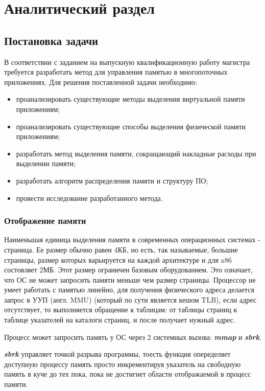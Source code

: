 \chapter{Аналитический раздел}
\label{cha:analysis}
\section{Постановка задачи}
В соответствии с заданием на выпускную квалификационную работу магистра требуется разработать метод для управления памятью в многопоточных приложениях.
Для решения поставленной задачи необходимо:
\begin{itemize}
	\item проанализировать существующие методы выделения виртуальной памяти приложениям;
	\item проанализировать существующие способы выделения физической памяти приложениям;
	\item разработать метод выделения памяти, сокращающий накладные расходы при выделении памяти;
	\item разработать алгоритм распределения памяти и структуру ПО;
	\item провести исследование разработанного метода.
\end{itemize}

\subsection{Отображение памяти}
Наименьшая единица выделения памяти в современных операционных системах - страница\cite{page}. Ее размер обычно равен 4КБ, но есть, так называемые, большие страницы, размер которых варьируется на каждой архитектуре и для x86 состовляет 2МБ. Этот размер ограничен базовым оборудованием. Это означает, что ОС не может запросить памяти меньше чем размер страницы. Процессор не умеет работать с памятью линейно, для получения физического адреса делается запрос в УУП (англ. MMU)\cite{mmu}  (который   по   сути является кешом TLB)\cite{tlb}, если адрес отсутствует, то выполняется обращение к таблицам: от таблицы страниц к таблице указателей на каталоги страниц, и после получает нужный адрес.\cite{wepskam}

Процесс может запросить память у ОС через 2 системных вызова: \textbf{\textit{mmap}}\cite{mmap} и \textbf{\textit{sbrk}}\cite{sbrk}.

\textbf{\textit{sbrk}} управляет точкой разрыва программы, тоесть функция опеределяет доступную процессу память просто инкрементируя указатель на свободную память в куче\cite{heap} до тех пока, пока не достигнет области отображаемой в процесс памяти.

